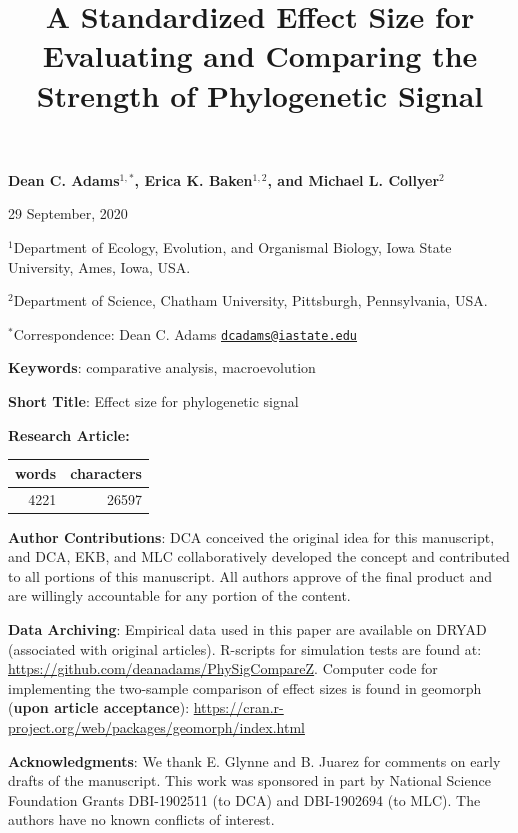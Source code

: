 \documentclass[
]{article}
\title{A Standardized Effect Size for Evaluating and Comparing the Strength of
Phylogenetic Signal}
\author{}
\date{\vspace{-2.5em}}
\begin{document}
\maketitle

\begin{center}
\textbf{Dean C. Adams$^{1,*}$, Erica K. Baken$^{1,2}$, and Michael L. Collyer$^2$}
\end{center}

\begin{center}29 September, 2020\end{center}

\(^{1}\)Department of Ecology, Evolution, and Organismal Biology, Iowa
State University, Ames, Iowa, USA.

\(^{2}\)Department of Science, Chatham University, Pittsburgh,
Pennsylvania, USA.

\(^{*}\)Correspondence: Dean C. Adams
\href{mailto:dcadams@iastate.edu}{\nolinkurl{dcadams@iastate.edu}}
\hfill\break

\textbf{Keywords}: comparative analysis, macroevolution \hfill\break

\textbf{Short Title}: Effect size for phylogenetic signal \hfill\break

\textbf{Research Article:}

\begin{longtable}[]{@{}rr@{}}
\toprule
words & characters\tabularnewline
\midrule
\endhead
4221 & 26597\tabularnewline
\bottomrule
\end{longtable}

\textbf{Author Contributions}: DCA conceived the original idea for this
manuscript, and DCA, EKB, and MLC collaboratively developed the concept
and contributed to all portions of this manuscript. All authors approve
of the final product and are willingly accountable for any portion of
the content.\hfill\break

\textbf{Data Archiving}: Empirical data used in this paper are available
on DRYAD (associated with original articles). R-scripts for simulation
tests are found at: \url{https://github.com/deanadams/PhySigCompareZ}.
Computer code for implementing the two-sample comparison of effect sizes
is found in geomorph (\textbf{upon article acceptance}):
\url{https://cran.r-project.org/web/packages/geomorph/index.html}
\hfill\break

\textbf{Acknowledgments}: We thank E. Glynne and B. Juarez for comments
on early drafts of the manuscript. This work was sponsored in part by
National Science Foundation Grants DBI-1902511 (to DCA) and DBI-1902694
(to MLC). The authors have no known conflicts of interest.
\end{document}

